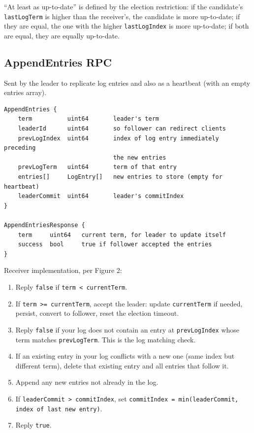 \documentclass[11pt,a4paper]{article}
\begin{document}
``At least as up-to-date'' is defined by the election restriction: if the candidate's \texttt{lastLogTerm} is higher than the receiver's, the candidate is more up-to-date; if they are equal, the one with the higher \texttt{lastLogIndex} is more up-to-date; if both are equal, they are equally up-to-date.

\subsection{AppendEntries RPC}
Sent by the leader to replicate log entries and also as a heartbeat (with an empty entries array).

\begin{codebox}
\begin{lstlisting}
AppendEntries {
    term          uint64       leader's term
    leaderId      uint64       so follower can redirect clients
    prevLogIndex  uint64       index of log entry immediately preceding
                               the new entries
    prevLogTerm   uint64       term of that entry
    entries[]     LogEntry[]   new entries to store (empty for heartbeat)
    leaderCommit  uint64       leader's commitIndex
}

AppendEntriesResponse {
    term     uint64   current term, for leader to update itself
    success  bool     true if follower accepted the entries
}
\end{lstlisting}
\end{codebox}

Receiver implementation, per Figure 2:

\begin{enumerate}
\item Reply \texttt{false} if \texttt{term < currentTerm}.
\item If \texttt{term >= currentTerm}, accept the leader: update \texttt{currentTerm} if needed, persist, convert to follower, reset the election timeout.
\item Reply \texttt{false} if your log does not contain an entry at \texttt{prevLogIndex} whose term matches \texttt{prevLogTerm}. This is the log matching check.
\item If an existing entry in your log conflicts with a new one (same index but different term), delete that existing entry and all entries that follow it.
\item Append any new entries not already in the log.
\item If \texttt{leaderCommit > commitIndex}, set \texttt{commitIndex = min(leaderCommit, index of last new entry)}.
\item Reply \texttt{true}.
\end{enumerate}
\end{document}
